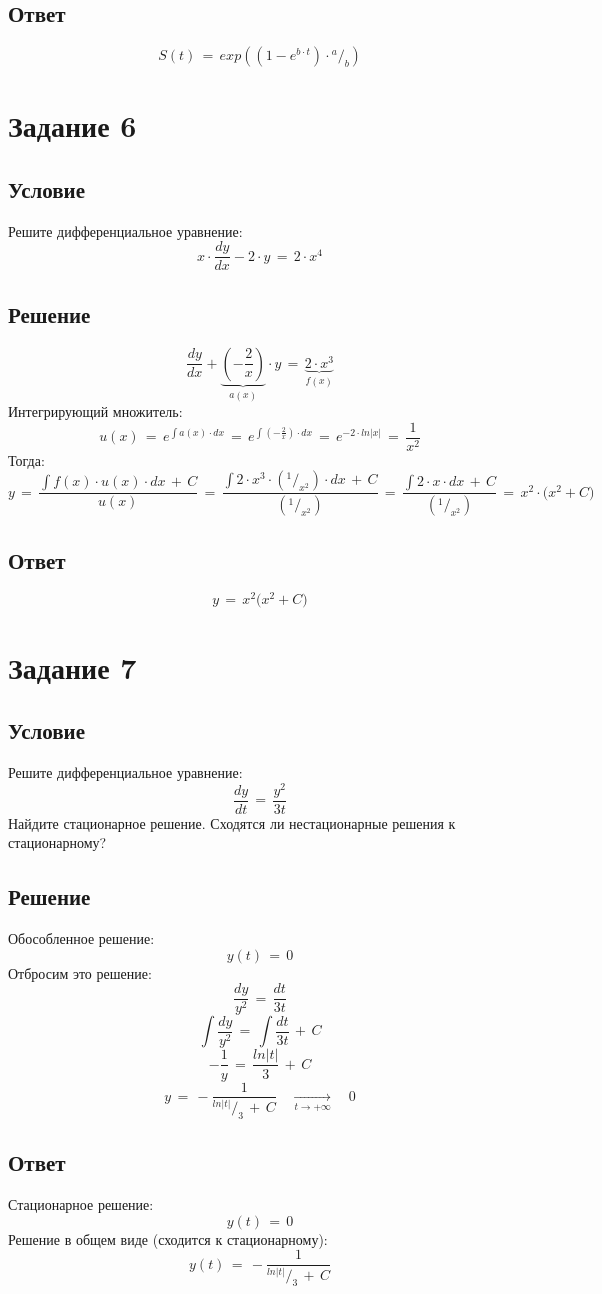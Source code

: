 \documentclass{article}
\newcommand*\rfrac[2]{{}^{#1}\!/_{#2}}
\begin{document}
\subsection*{Ответ}
\[ S(t) \, = \, exp \left( (1 \! - \! e^{b \cdot t}) \! \cdot \rfrac{a}{b} \right) \]
\section*{Задание 6}
\subsection*{Условие}
Решите дифференциальное уравнение:
\[ x \! \cdot \! \dfrac{dy}{dx} \! - \! 2 \! \cdot \! y \, = \, 2 \! \cdot \! x^4 \]
\subsection*{Решение}
\[ \dfrac{dy}{dx} \! + \! \underbrace{\left( - \dfrac{2}{x} \right)}_{a(x)} \! \cdot y \, = \, \underbrace{2 \! \cdot \! x^3}_{f(x)} \]
Интегрирующий множитель:
\[ u(x) \, = \, e^{\int a(x) \cdot dx} \, = \, e^{\int \left( -\frac{2}{x} \right) \cdot dx} \, = \, e^{-2 \cdot ln|x|} \, = \, \dfrac{1}{x^2} \]
Тогда:
\[ y \, = \, \dfrac{\int f(x) \! \cdot \! u(x) \! \cdot \! dx \, + \, C}{u(x)} \, = \, \dfrac{\int 2 \! \cdot \! x^3 \! \cdot \! (\rfrac{1}{x^2}) \! \cdot \! dx \, + \, C}{(\rfrac{1}{x^2})} \, = \, \dfrac{\int 2 \! \cdot \! x \! \cdot \! dx \, + \, C}{(\rfrac{1}{x^2})} \, = \, x^2 \! \cdot \! \big( x^2 \! + \! C \big) \]
\subsection*{Ответ}
\[ y \, = \, x^2 \big( x^2 \! + \! C \big) \]
\section*{Задание 7}
\subsection*{Условие}
Решите дифференциальное уравнение: 
\[ \dfrac{dy}{dt} \, = \, \dfrac{y^2}{3t} \]
Найдите стационарное решение. Сходятся ли нестационарные решения к стационарному?
\subsection*{Решение}
Обособленное решение:
\[ y(t) \, = \, 0 \]
Отбросим это решение:
\[ \dfrac{dy}{y^2} \, = \, \dfrac{dt}{3t} \]
\[ \int \dfrac{dy}{y^2} \, = \, \int \dfrac{dt}{3t} \, + \, C \]
\[ -\dfrac{1}{y} \, = \, \dfrac{ln|t|}{3} \, + \, C \]
\[ y \, = \, -\dfrac{1}{\rfrac{ln|t|}{3} \, + \, C} \quad \underset{t \rightarrow +\infty}{\longrightarrow} \quad 0 \]\par
\subsection*{Ответ}
Стационарное решение:
\[ y(t) \, = \, 0 \]
Решение в общем виде (сходится к стационарному):
\[ y(t) \, = \, -\dfrac{1}{\rfrac{ln|t|}{3} \, + \, C} \]
\end{document}
